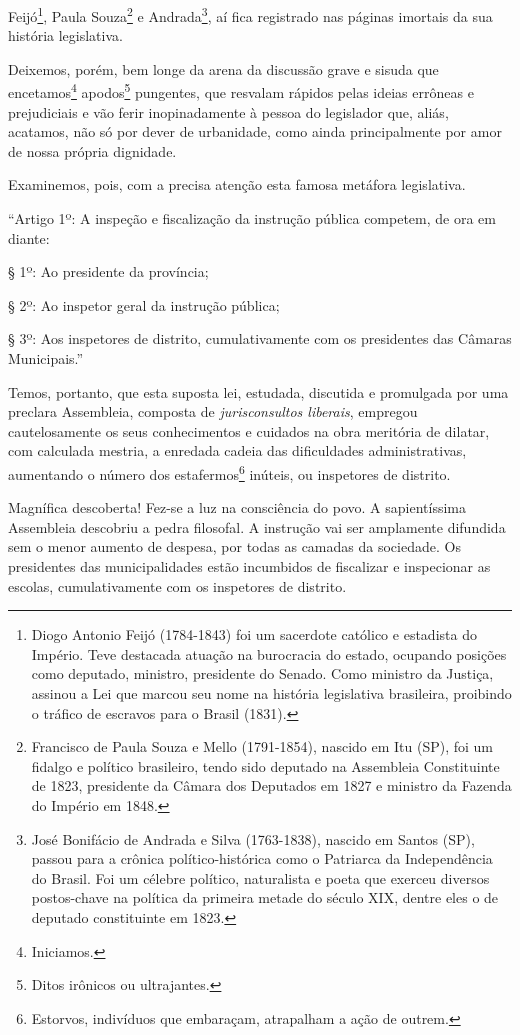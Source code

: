 Feijó\footnote{Diogo Antonio Feijó (1784-1843) foi um sacerdote
  católico e estadista do Império. Teve destacada atuação na burocracia
  do estado, ocupando posições como deputado, ministro, presidente do
  Senado. Como ministro da Justiça, assinou a Lei que marcou seu nome na
  história legislativa brasileira, proibindo o tráfico de escravos para
  o Brasil (1831).}, Paula Souza\footnote{Francisco de Paula Souza e
  Mello (1791-1854), nascido em Itu (SP), foi um fidalgo e político
  brasileiro, tendo sido deputado na Assembleia Constituinte de 1823,
  presidente da Câmara dos Deputados em 1827 e ministro da Fazenda do
  Império em 1848.} e Andrada\footnote{José Bonifácio de Andrada e
  Silva (1763-1838), nascido em Santos (SP), passou para a crônica
  político-histórica como o Patriarca da Independência do Brasil. Foi um
  célebre político, naturalista e poeta que exerceu diversos
  postos-chave na política da primeira metade do século XIX, dentre eles
  o de deputado constituinte em 1823.}, aí fica registrado nas páginas
imortais da sua história legislativa.

Deixemos, porém, bem longe da arena da discussão grave e sisuda que
encetamos\footnote{Iniciamos.} apodos\footnote{Ditos irônicos ou
  ultrajantes.} pungentes, que resvalam rápidos pelas ideias errôneas e
prejudiciais e vão ferir inopinadamente à pessoa do legislador que,
aliás, acatamos, não só por dever de urbanidade, como ainda
principalmente por amor de nossa própria dignidade.

Examinemos, pois, com a precisa atenção esta famosa metáfora
legislativa.

``Artigo 1º: A inspeção e fiscalização da instrução pública competem, de
ora em diante:

§ 1º: Ao presidente da província;

§ 2º: Ao inspetor geral da instrução pública;

§ 3º: Aos inspetores de distrito, cumulativamente com os presidentes das
Câmaras Municipais.''

Temos, portanto, que esta suposta lei, estudada, discutida e promulgada
por uma preclara Assembleia, composta de \emph{jurisconsultos liberais},
empregou cautelosamente os seus conhecimentos e cuidados na obra
meritória de dilatar, com calculada mestria, a enredada cadeia das
dificuldades administrativas, aumentando o número dos
estafermos\footnote{Estorvos, indivíduos que embaraçam, atrapalham a
  ação de outrem.} inúteis, ou inspetores de distrito.

Magnífica descoberta! Fez-se a luz na consciência do povo. A
sapientíssima Assembleia descobriu a pedra filosofal. A instrução vai
ser amplamente difundida sem o menor aumento de despesa, por todas as
camadas da sociedade. Os presidentes das municipalidades estão
incumbidos de fiscalizar e inspecionar as escolas, cumulativamente com
os inspetores de distrito.

